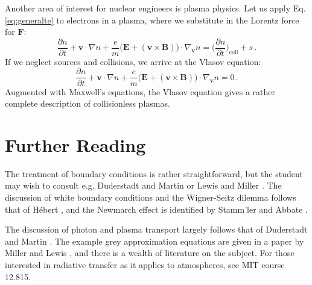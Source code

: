 Another area of interest for nuclear engineers is plasma physics.  Let us apply Eq. \ref{eq:generalte} to electrons in a plasma, where we substitute in the Lorentz force for $\mathbf{F}$:
\begin{equation}
  \frac{\partial n}{\partial t} 
   + \mathbf{v} \cdot \nabla n + \frac{e}{m} \Big ( \mathbf{E}+(\mathbf{v}\times \mathbf{B} ) \Big ) \cdot \nabla_{\mathbf{v}} n =   \Big( \frac{\partial n}{\partial t} \Big )_{\mathrm{coll}} +  s \, .
\end{equation}
If we neglect sources and collisions, we arrive at the Vlasov equation:
\begin{equation}
  \frac{\partial n}{\partial t} 
   + \mathbf{v} \cdot \nabla n + \frac{e}{m} \Big ( \mathbf{E}+(\mathbf{v}\times \mathbf{B} ) \Big ) \cdot \nabla_{\mathbf{v}} n =  0 \, .
\end{equation}
Augmented with Maxwell's equations, the Vlasov equation gives a rather complete description of collisionless plasmas.  

\section*{Further Reading}

The treatment of boundary conditions is rather straightforward, but the student may wish to consult e.g. Duderstadt and Martin \cite{duderstadt1976tt} or Lewis and Miller \cite{lewis1993cmn}.  The discussion of white boundary conditions and the Wigner-Seitz dilemma follows that of H\'{e}bert \cite{hebert2009arp}, and the Newmarch effect is identified by Stamm'ler and Abbate \cite{stammler1983mss}.   

The discussion of photon and plasma transport largely follows that of Duderstadt and Martin \cite{duderstadt1976tt}.  The example grey approximation equations are given in a paper by Miller and Lewis \cite{miller1987nrm}, and there is a wealth of literature on the subject.  For those interested in radiative transfer as it applies to atmospheres, see MIT course 12.815.



